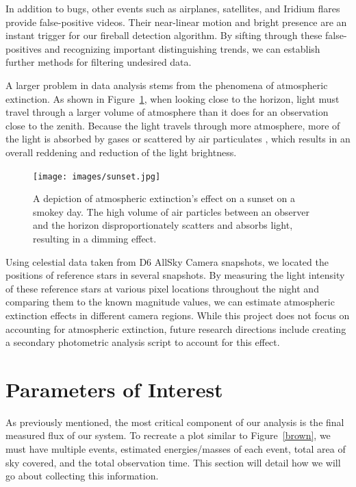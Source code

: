 In addition to bugs, other events such as airplanes, satellites, and Iridium flares provide false-positive videos.
Their near-linear motion and bright presence are an instant trigger for our fireball detection algorithm.  
By sifting through these false-positives and recognizing important distinguishing trends, we can establish further methods for filtering undesired data.

A larger problem in data analysis stems from the phenomena of atmospheric extinction.
As shown in Figure~\ref{extinc}, when looking close to the horizon, light must travel through a larger volume of atmosphere than it does for an observation close to the zenith.  
Because the light travels through more atmosphere, more of the light is absorbed by gases or scattered by air particulates \cite{hughes_atmospheric_2016}, which results in an overall reddening and reduction of the light brightness.



\begin{figure}[ht!]
  \centering
  \texttt{[image: images/sunset.jpg]}
  \caption{A depiction of atmospheric extinction's effect on a sunset on a smokey day.  The high volume of air particles between an observer and the horizon disproportionately scatters and absorbs light, resulting in a dimming effect.}
  \label{extinc}
\end{figure}


Using celestial data taken from D6 AllSky Camera snapshots, we located the positions of reference stars in several snapshots.
By measuring the light intensity of these reference stars at various pixel locations throughout the night and comparing them to the known magnitude values, we can estimate atmospheric extinction effects in different camera regions.
While this project does not focus on accounting for atmospheric extinction, future research directions include creating a secondary photometric analysis script to account for this effect.


\section{Parameters of Interest}

As previously mentioned, the most critical component of our analysis is the final measured flux of our system. 
To recreate a plot similar to Figure~\ref{brown}, we must have multiple events, estimated energies/masses of each event, total area of sky covered, and the total observation time.
This section will detail how we will go about collecting this information.


